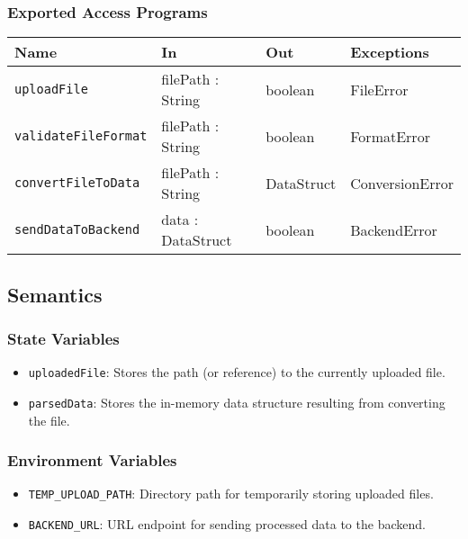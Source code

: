 \documentclass[12pt, titlepage]{article}
\begin{document}
\subsubsection{Exported Access Programs}

\begin{center}
\begin{tabular}{p{5cm} p{3.5cm} p{3.5cm} p{2cm}}
\hline
\textbf{Name} & \textbf{In} & \textbf{Out} & \textbf{Exceptions} \\
\hline
\texttt{uploadFile} & filePath : String & boolean & FileError \\
\texttt{validateFileFormat} & filePath : String & boolean & FormatError \\
\texttt{convertFileToData} & filePath : String & DataStruct & ConversionError \\
\texttt{sendDataToBackend} & data : DataStruct & boolean & BackendError \\
\hline
\end{tabular}
\end{center}

\subsection{Semantics}

\subsubsection{State Variables}


\begin{itemize}
    \item \texttt{uploadedFile}: Stores the path (or reference) to the currently uploaded file.
    \item \texttt{parsedData}: Stores the in-memory data structure resulting from converting the file.
\end{itemize}

\subsubsection{Environment Variables}

\begin{itemize}
    \item \texttt{TEMP\_UPLOAD\_PATH}: Directory path for temporarily storing uploaded files.
    \item \texttt{BACKEND\_URL}: URL endpoint for sending processed data to the backend.
\end{itemize}
\end{document}
